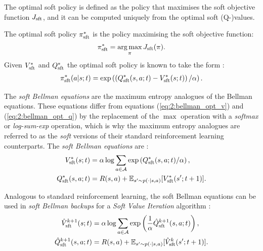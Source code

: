     The optimal soft policy is defined as the policy that maximises the soft objective function $J_{{\textnormal{sft}}}$, and it can be computed uniquely from the optimal soft (Q-)values.
    \begin{defn}
        \label{def:2:opt_sft_policy}
        The \textnormal{optimal soft policy} $\pi_{{\textnormal{sft}}}^*$ is the policy maximising the soft objective function:
        \begin{align}
            \pi_{{\textnormal{sft}}}^* = \operatorname*{arg\,max}_\pi J_{{\textnormal{sft}}}(\pi). \label{eq:2:opt_sft_policy_def}
        \end{align}
        Given $V_{{\textnormal{sft}}}^*$ and $Q_{{\textnormal{sft}}}^*$ the optimal soft policy is known to take the form \cite{deep_energy_policies}:
        \begin{align}
            \pi_{{\textnormal{sft}}}^*(a|s;t) = \exp\left(\left(Q_{{\textnormal{sft}}}^*(s,a;t) - V_{{\textnormal{sft}}}^*(s;t)\right) / \alpha \right). \label{eq:2:opt_sft_policy_from_opt_value_fns}
        \end{align}
    \end{defn}

    The \textit{soft Bellman equations} are the maximum entropy analogues of the Bellman equations. These equations differ from equations (\ref{eq:2:bellman_opt_v}) and (\ref{eq:2:bellman_opt_q}) by the replacement of the $\max$ operation with a \textit{softmax} or \textit{log-sum-exp} operation, which is why the maximum entropy analogues are referred to as the \textit{soft} versions of their standard reinforcement learning counterparts. The \textit{soft Bellman equations} are \cite{deep_energy_policies}:
    \begin{align}
        V_{{\textnormal{sft}}}^*(s;t) &= \alpha \log \sum_{a\in\mathcal{A}} \exp\left( Q_{{\textnormal{sft}}}^*(s,a;t) / \alpha \right), \label{eq:2:sft_bellman_opt_v} \\
        Q_{{\textnormal{sft}}}^*(s,a;t) &= R(s,a) + \mathbb{E}_{s'\sim p(\cdot|s,a)} [V_{{\textnormal{sft}}}^*(s';t+1)]. \label{eq:2:sft_bellman_opt_q}
    \end{align} 

    Analogous to standard reinforcement learning, the soft Bellman equations can be used in \textit{soft Bellman backups} for a \textit{Soft Value Iteration} algorithm \cite{deep_energy_policies}:
    \begin{align}
        \hat{V}_{{\textnormal{sft}}}^{k+1}(s;t) &= \alpha \log \sum_{a\in\mathcal{A}} \exp\left( \frac{1}{\alpha} \hat{Q}_{{\textnormal{sft}}}^{k+1}(s,a;t) \right), \label{eq:2:soft_value_iter_v_backup} \\
        \hat{Q}_{{\textnormal{sft}}}^{k+1}(s,a;t) &= R(s,a) + \mathbb{E}_{s'\sim p(\cdot|s,a)} [\hat{V}_{{\textnormal{sft}}}^k(s';t+1)]. \label{eq:2:soft_value_iter_q_backup}
    \end{align}



